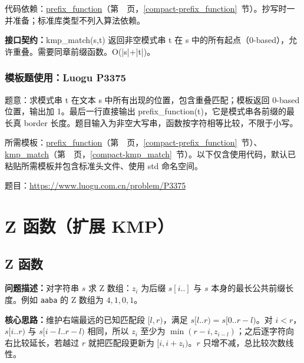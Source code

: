 代码依赖：\hyperref[compact-prefix_function]{prefix\_\allowbreak{}function}（第~\pageref{compact-prefix_function}~页，\ref{compact-prefix_function}~节）。抄写时一并准备；标准库类型不列入算法依赖。

{\sloppy{}\noindent\textbf{接口契约：}kmp\_match(s,t) 返回非空模式串 t 在 s 中的所有起点（0-based），允许重叠。需要同章前缀函数。O(|s|+|t|)。\par}



\Needspace{293pt}

\subsection*{模板题使用：Luogu P3375}

\label{usage-example-91}

题意：求模式串 t 在文本 s 中所有出现的位置，包含重叠匹配；模板返回 0-based 位置，输出加 1。最后一行直接输出 prefix\_function(t)，它是模式串各前缀的最长真 border 长度。题目输入为非空大写串，函数按字符相等比较，不限于小写。

所需模板：\hyperref[compact-prefix_function]{prefix\_\allowbreak{}function}（第~\pageref{compact-prefix_function}~页，\ref{compact-prefix_function}~节）、\hyperref[compact-kmp_match]{kmp\_\allowbreak{}match}（第~\pageref{compact-kmp_match}~页，\ref{compact-kmp_match}~节）。以下仅含使用代码，默认已粘贴所需模板并包含标准头文件、使用 std 命名空间。

题目：\url{https://www.luogu.com.cn/problem/P3375}



\Needspace{383pt}

\chapter{Z 函数（扩展 KMP）}

\section{Z 函数}\label{compact-z_function}

\noindent\textbf{问题描述：}\allowbreak 对字符串 $s$ 求 Z 数组：$z_i$ 为后缀 $s[i..]$ 与 $s$ 本身的最长公共前缀长度。例如 \texttt{aaba} 的 Z 数组为 $4,1,0,1$。

\textbf{核心思路：}\allowbreak 维护右端最远的已知匹配段 $[l,r)$，满足 $s[l..r)=s[0..r-l)$。对 $i<r$，$s[i..r)$ 与 $s[i-l..r-l)$ 相同，所以 $z_i$ 至少为 $\min(r-i,z_{i-l})$；之后逐字符向右比较延长，若越过 $r$ 就把匹配段更新为 $[i,i+z_i)$。$r$ 只增不减，总比较次数线性。




